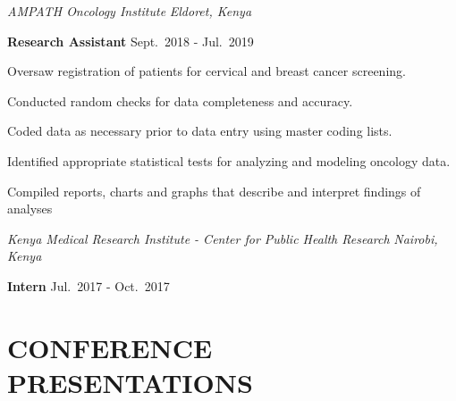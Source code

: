 \documentclass[13pt,]{article}
\providecommand{\tightlist}{%
  \setlength{\itemsep}{0pt}\setlength{\parskip}{0pt}}
\renewenvironment{itemize}{
  \begin{list}{}{
    \setlength{\leftmargin}{1.5em}
  }
}{
  \end{list}
}
\begin{document}
\emph{AMPATH Oncology Institute} \hfill \emph{Eldoret, Kenya}

\textbf{Research Assistant} \hfill Sept.~2018 - Jul.~2019

\begin{itemize}
\tightlist
\item
  Oversaw registration of patients for cervical and breast cancer
  screening.
\item
  Conducted random checks for data completeness and accuracy.
\item
  Coded data as necessary prior to data entry using master coding lists.
\item
  Identified appropriate statistical tests for analyzing and modeling
  oncology data.
\item
  Compiled reports, charts and graphs that describe and interpret
  findings of analyses
\end{itemize}

\emph{Kenya Medical Research Institute - Center for Public Health
Research} \hfill \emph{Nairobi, Kenya}

\textbf{Intern} \hfill Jul.~2017 - Oct.~2017

\hypertarget{conference-presentations}{%
\section{\texorpdfstring{\textbf{CONFERENCE
PRESENTATIONS}}{CONFERENCE PRESENTATIONS}}\label{conference-presentations}}
\end{document}
